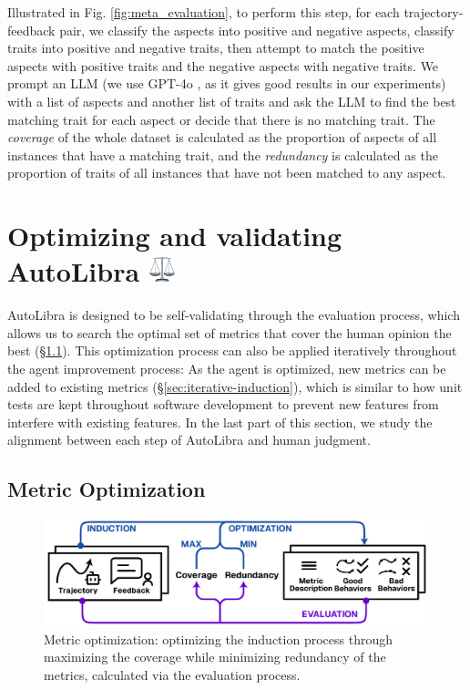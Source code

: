 Illustrated in Fig. \ref{fig:meta_evaluation}, to perform this step, for each trajectory-feedback pair, we classify the aspects into positive and negative aspects, classify
traits into positive and negative traits, then attempt to match the positive aspects with positive traits
and the negative aspects with negative traits. 
We prompt an LLM (we use GPT-4o \citep{openai2024gpt4ocard},
as it gives good results in our experiments) with a list of aspects and another list of traits
and ask the LLM to find the best matching trait for each aspect or decide that there is no matching trait.
The \emph{coverage} of the whole dataset is calculated as the  proportion of aspects of all instances that have a matching trait,
and the \emph{redundancy} is calculated as the proportion of traits of all instances that have not been matched to any aspect.

\section{Optimizing and validating AutoLibra \protect\includegraphics[height=1em]{figs/scale.png}}
AutoLibra is designed to be self-validating through the evaluation process, which allows us to search the optimal set of metrics that cover the human opinion the best (\S\ref{sec:metric-optimization}). 
This optimization process can also be applied iteratively throughout the agent improvement process: As the agent is optimized, new metrics can be added to existing metrics (\S\ref{sec:iterative-induction}), which is similar to how unit tests are kept throughout software development to prevent new features from interfere with existing features. 
In the last part of this section, we study the alignment between each step of AutoLibra and human judgment. 


\subsection{Metric Optimization}
\label{sec:metric-optimization}

\begin{figure}[!t]
    \centering
    \includegraphics[width=0.8\linewidth]{figs/autolibra_optimization.pdf}
    \caption{Metric optimization: optimizing the induction process through maximizing the coverage while minimizing redundancy of the metrics, calculated via the evaluation process.}
    \label{fig:autolibra_optimization}
\end{figure}


